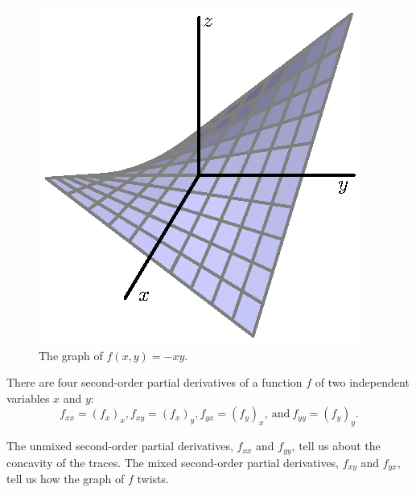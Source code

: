 \begin{figure}[ht]
  \begin{center}
    \includegraphics[scale=0.8]{figures/fig_10_3_ruled.eps}
  \end{center}
  \caption{The graph of $f(x,y) = -xy$.}
  \label{F:10.3.ruled}
\end{figure}


%

%




\begin{summary}
\item There are four second-order partial derivatives of a function
  $f$ of two independent variables $x$ and $y$:
  $$
  f_{xx} = (f_x)_x,
  f_{xy} = (f_x)_y,
  f_{yx} = (f_y)_x,\ \mbox{and} \ 
  f_{yy} = (f_y)_y.
  $$

  \item The unmixed second-order partial derivatives, $f_{xx}$ and
    $f_{yy}$, tell us about the concavity of the traces. The mixed second-order partial derivatives, $f_{xy}$ and
    $f_{yx}$, tell us how the graph of $f$ twists.

  \end{summary}


\nin \hrulefill



\clearpage
